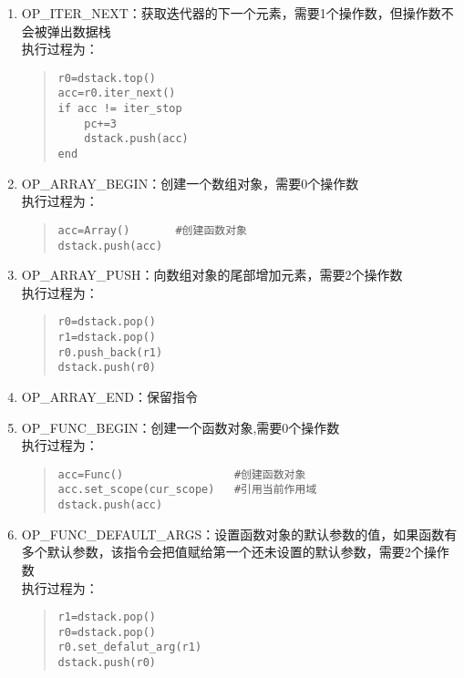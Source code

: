 \begin{enumerate}
\item OP\_ITER\_NEXT：获取迭代器的下一个元素，需要1个操作数，但操作数不会被弹出数据栈 \\
执行过程为：
\begin{quote}
\begin{verbatim}
r0=dstack.top()
acc=r0.iter_next()
if acc != iter_stop
    pc+=3
    dstack.push(acc)
end
\end{verbatim}
\end{quote}

\item OP\_ARRAY\_BEGIN：创建一个数组对象，需要0个操作数 \\
执行过程为：
\begin{quote}
\begin{verbatim}
acc=Array()       #创建函数对象
dstack.push(acc)
\end{verbatim}
\end{quote}

\item OP\_ARRAY\_PUSH：向数组对象的尾部增加元素，需要2个操作数 \\
执行过程为：
\begin{quote}
\begin{verbatim}
r0=dstack.pop()
r1=dstack.pop()
r0.push_back(r1)
dstack.push(r0)
\end{verbatim}
\end{quote}

\item OP\_ARRAY\_END：保留指令
\item OP\_FUNC\_BEGIN：创建一个函数对象,需要0个操作数 \\
执行过程为：
\begin{quote}
\begin{verbatim}
acc=Func()                 #创建函数对象
acc.set_scope(cur_scope)   #引用当前作用域
dstack.push(acc)
\end{verbatim}
\end{quote}

\item OP\_FUNC\_DEFAULT\_ARGS：设置函数对象的默认参数的值，如果函数有多个默认参数，该指令会把值赋给第一个还未设置的默认参数，需要2个操作数 \\
执行过程为：
\begin{quote}
\begin{verbatim}
r1=dstack.pop()
r0=dstack.pop()
r0.set_defalut_arg(r1)
dstack.push(r0)
\end{verbatim}
\end{quote}


\end{enumerate}
